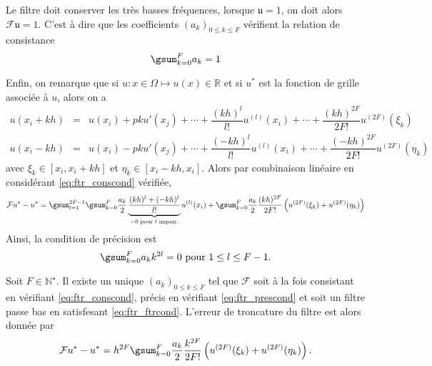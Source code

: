 Le filtre doit conserver les très basses fréquences, lorsque $\mathfrak{u} = \mathfrak{1}$, on doit alors $\mathcal{F}\mathfrak{u} = \mathfrak{1}$.
C'est à dire que les coefficients $(a_k)_{0 \leq k \leq F}$ vérifient la relation de consistance
\begin{equation}
\gsum_{k=0}^F a_k = 1
\label{eq:ftr_conscond}
\end{equation}

Enfin, on remarque que si $u : x \in \Omega \mapsto u(x) \in \mathbb{R}$ et si $u^*$ est la fonction de grille associée à $u$, alors on a 
\begin{equation}
\begin{array}{rcl}
u(x_i + kh) & = & u(x_i) + p k u'(x_j) + \cdots + \dfrac{(kh)^l}{l!}u^{(l)}(x_i) + \cdots +\dfrac{(kh)^{2F}}{2F!} u^{(2F)}(\xi_k)\\
u(x_i - kh) & = & u(x_i) - p k u'(x_j) + \cdots + \dfrac{(-kh)^l}{l!}u^{(l)}(x_i) + \cdots +\dfrac{(-kh)^{2F}}{2F!} u^{(2F)}(\eta_k)
\end{array}
\end{equation}
avec $\xi_k \in [x_i, x_i+kh]$ et $\eta_k \in [x_i-kh, x_i]$. Alors par combinaison linéaire en considérant \eqref{eq:ftr_conscond} vérifiée, 
\begin{equation}
\mathcal{F}u^* - u^* = \gsum_{l=1}^{2F-1} \gsum_{k=0}^F \dfrac{a_k}{2} \underbrace{\dfrac{(kh)^l + (-kh)^l}{l!}}_{=0 \text{ pour } l \text{ impair.}}u^{(l)}(x_i) + \gsum_{k=0}^F \dfrac{a_k}{2}\dfrac{(kh)^{2F}}{2F!} \left( u^{(2F)}(\xi_k) + u^{(2F)}(\eta_k) \right)
\end{equation}
Ainsi, la condition de précision est 
\begin{equation}
\gsum_{k=0}^F a_k k^{2l} = 0 \text{ pour } 1 \leq l \leq F-1.
\label{eq:ftr_prescond}
\end{equation}

\begin{theoreme}
Soit $F \in \mathbb{N}^{\star}$. Il existe un unique $(a_k)_{0 \leq k \leq F}$ tel que $\mathcal{F}$ soit à la fois consistant en vérifiant \eqref{eq:ftr_conscond}, précis en vérifiant \eqref{eq:ftr_prescond} et soit un filtre passe bas en satisfesant \eqref{eq:ftr_ftrcond}. L'erreur de troncature du filtre est alors donnée par 
\begin{equation}
\mathcal{F}u^* - u^* = h^{2F} \gsum_{k=0}^F \dfrac{a_k}{2} \dfrac{k^{2F}}{2F!} \left( u^{(2F)}(\xi_k) + u^{(2F)}(\eta_k) \right).
\end{equation}
\label{prop:filter_def}
\end{theoreme}

